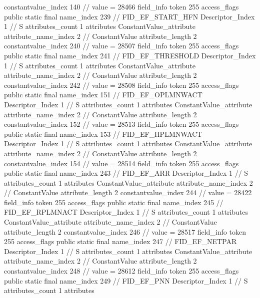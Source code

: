 {{{{{{{					constantvalue_index	140		// value = 28466
				}
				}
			}
			field_info {
				token	255
				access_flags	public static final
				name_index	239		// FID_EF_START_HFN
				Descriptor_Index	1		// S
				attributes_count	1
				attributes {
				ConstantValue_attribute {
					attribute_name_index	2		// ConstantValue
					attribute_length	2
					constantvalue_index	240		// value = 28507
				}
				}
			}
			field_info {
				token	255
				access_flags	public static final
				name_index	241		// FID_EF_THRESHOLD
				Descriptor_Index	1		// S
				attributes_count	1
				attributes {
				ConstantValue_attribute {
					attribute_name_index	2		// ConstantValue
					attribute_length	2
					constantvalue_index	242		// value = 28508
				}
				}
			}
			field_info {
				token	255
				access_flags	public static final
				name_index	151		// FID_EF_OPLMNWACT
				Descriptor_Index	1		// S
				attributes_count	1
				attributes {
				ConstantValue_attribute {
					attribute_name_index	2		// ConstantValue
					attribute_length	2
					constantvalue_index	152		// value = 28513
				}
				}
			}
			field_info {
				token	255
				access_flags	public static final
				name_index	153		// FID_EF_HPLMNWACT
				Descriptor_Index	1		// S
				attributes_count	1
				attributes {
				ConstantValue_attribute {
					attribute_name_index	2		// ConstantValue
					attribute_length	2
					constantvalue_index	154		// value = 28514
				}
				}
			}
			field_info {
				token	255
				access_flags	public static final
				name_index	243		// FID_EF_ARR
				Descriptor_Index	1		// S
				attributes_count	1
				attributes {
				ConstantValue_attribute {
					attribute_name_index	2		// ConstantValue
					attribute_length	2
					constantvalue_index	244		// value = 28422
				}
				}
			}
			field_info {
				token	255
				access_flags	public static final
				name_index	245		// FID_EF_RPLMNACT
				Descriptor_Index	1		// S
				attributes_count	1
				attributes {
				ConstantValue_attribute {
					attribute_name_index	2		// ConstantValue
					attribute_length	2
					constantvalue_index	246		// value = 28517
				}
				}
			}
			field_info {
				token	255
				access_flags	public static final
				name_index	247		// FID_EF_NETPAR
				Descriptor_Index	1		// S
				attributes_count	1
				attributes {
				ConstantValue_attribute {
					attribute_name_index	2		// ConstantValue
					attribute_length	2
					constantvalue_index	248		// value = 28612
				}
				}
			}
			field_info {
				token	255
				access_flags	public static final
				name_index	249		// FID_EF_PNN
				Descriptor_Index	1		// S
				attributes_count	1
				attributes {
}}}}}}
